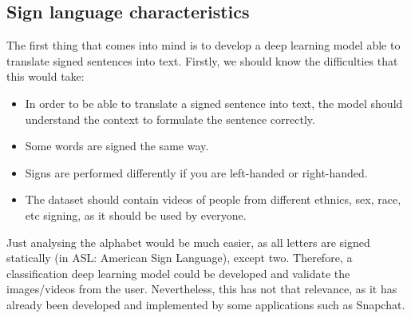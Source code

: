 \subsection{Sign language characteristics}
The first thing that comes into mind is to develop a deep learning model able to translate signed sentences into 
text. Firstly, we should know the difficulties that this would take:
\begin{itemize}[noitemsep]
    \item In order to be able to translate a signed sentence into text, the model should understand the context to formulate the sentence correctly.
    \item Some words are signed the same way.
    \item Signs are performed differently if you are left-handed or right-handed.
    \item The dataset should contain videos of people from different ethnics, sex, race, etc signing, as it should be used by everyone.
\end{itemize}

Just analysing the alphabet would be much easier, as all letters are signed statically (in ASL: American Sign Language), except two.
Therefore, a classification deep learning model could be developed and validate the images/videos from the user.
Nevertheless, this has not that relevance, as it has already been developed and implemented by some applications such as Snapchat.

